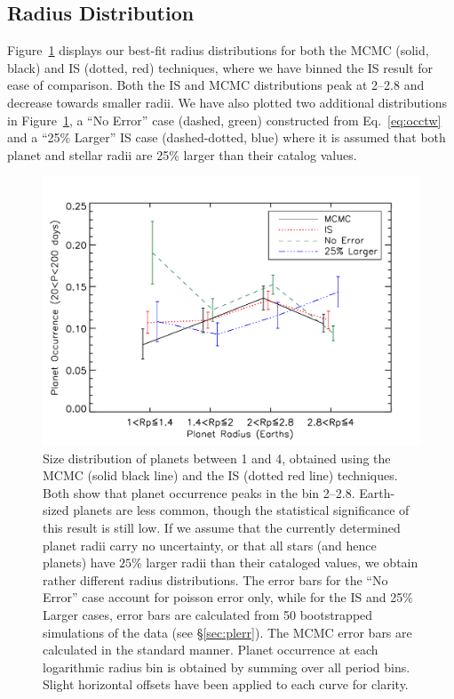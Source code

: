\subsection{Radius Distribution}
\label{sec:radiusdist}

Figure~\ref{fig:raddist} displays our best-fit radius distributions
for both the MCMC (solid, black) and IS (dotted, red) techniques,
where we have binned the IS result for ease of comparison.  Both the IS and MCMC
distributions peak at 2--2.8\rearth{} and decrease towards smaller
radii.  We have also plotted two additional distributions in
Figure~\ref{fig:raddist}, a ``No Error'' case (dashed, green)
constructed from Eq.~\ref{eq:occtw} and a ``25$\%$ Larger'' IS case
(dashed-dotted, blue) where it is assumed that both planet and stellar
radii are 25$\%$ larger than their catalog values.


%
\begin{figure}
\centerline{\includegraphics[scale=0.55]{chap2/Silburt_Rdist_all.pdf}}
\caption{Size distribution of planets between 1 and 4\rearth{},
  obtained using the MCMC (solid black line) and the IS (dotted red
  line) techniques. Both show that planet occurrence peaks in the bin
  2--2.8\rearth{}. Earth-sized planets are less common, 
  though the statistical significance of this result is
  still low. If we assume that the currently determined planet radii
  carry no uncertainty, or that all stars (and hence planets) have
  $25\%$ larger radii than their cataloged values,
  we obtain rather different radius distributions. The error bars for
  the ``No Error'' case account for poisson error only, while for the
  IS and 25$\%$ Larger cases, error bars are calculated from 50 bootstrapped
  simulations of the data (see \S \ref{sec:plerr}). The MCMC error bars are 
  calculated in the standard manner. Planet occurrence at
  each logarithmic radius bin is obtained by summing over all period
  bins.  Slight horizontal offsets have been applied to each curve for clarity.}
\label{fig:raddist}
\end{figure}
 

